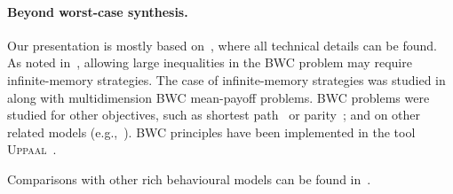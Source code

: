 \paragraph{Beyond worst-case synthesis.} Our presentation is mostly based on~\cite{Bruyere&al:2017}, where all technical details can be found. As noted in~\cite{Bruyere&al:2017}, allowing large inequalities in the BWC problem may require infinite-memory strategies. The case of infinite-memory strategies was studied in~\cite{Clemente&Raskin:2015} along with multidimension BWC mean-payoff problems. BWC problems were studied for other objectives, such as shortest path~\cite{Bruyere&al:2017} or parity~\cite{Berthon&Randour&Raskin:2017}; and on other related models (e.g.,~\cite{Brazdil&Kucera&Novotny:2016,Almagor&Kupferman&Velner:2016}). BWC principles have been implemented in the tool \textsc{Uppaal}~\cite{David&al:2014}.

Comparisons with other rich behavioural models can be found in~\cite{Randour&Raskin&Sankur:2015,Brenguier&al:2016}.